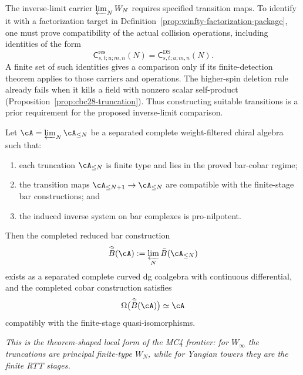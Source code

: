 \begin{example}
\label{ex:winfty-completion-frontier}
The inverse-limit carrier $\varprojlim_N W_N$ requires specified transition maps.
To identify it with a factorization target in Definition~\ref{prop:winfty-factorization-package}, one must prove compatibility of the actual collision operations, including identities of the form
\[
 \mathsf{C}^{\mathrm{res}}_{s,t;u;m,n}(N)
 =\mathsf{C}^{\mathrm{DS}}_{s,t;u;m,n}(N).
\]
A finite set of such identities gives a comparison only if its finite-detection theorem applies to those carriers and operations.
The higher-spin deletion rule already fails when it kills a field with nonzero scalar self-product (Proposition~\ref{prop:cbc28-truncation}).
Thus constructing suitable transitions is a prior requirement for the proposed inverse-limit comparison.
\end{example}

\begin{conjecture}
\label{conj:inverse-limit-completed-bar-cobar}
Let $\cA = \varprojlim_N \cA_{\le N}$ be a separated complete
weight-filtered chiral algebra such that:
\begin{enumerate}
\item each truncation $\cA_{\le N}$ is finite type and lies in the
  proved bar-cobar regime;
\item the transition maps $\cA_{\le N+1} \to \cA_{\le N}$ are compatible
  with the finite-stage bar constructions; and
\item the induced inverse system on bar complexes is pro-nilpotent.
\end{enumerate}
Then the completed reduced bar construction
\[
\widehat{\bar B}(\cA) := \varprojlim_N \bar B(\cA_{\le N})
\]
exists as a separated complete curved dg coalgebra with continuous
differential, and the completed cobar construction satisfies
\[
\Omega\bigl(\widehat{\bar B}(\cA)\bigr) \simeq \cA
\]
compatibly with the finite-stage quasi-isomorphisms.

\emph{This is the theorem-shaped local form of the MC4 frontier:
for $W_\infty$ the truncations are principal finite-type $W_N$, while
for Yangian towers they are the finite RTT stages.}
\end{conjecture}

